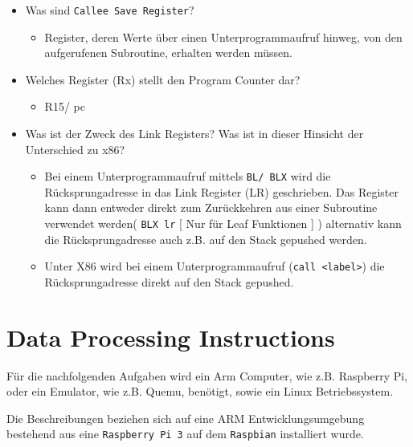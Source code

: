 \documentclass[12pt]{article}
\begin{document}
\begin{itemize}
    \item Was sind \texttt{Callee Save Register}?
        \begin{itemize}
            \item Register, deren Werte über einen Unterprogrammaufruf hinweg,
                von den aufgerufenen Subroutine, erhalten werden müssen.
        \end{itemize}
    \item Welches Register (Rx) stellt den Program Counter dar?
        \begin{itemize}
            \item R15/ pc
        \end{itemize}
    \item Was ist der Zweck des Link Registers? Was ist in dieser Hinsicht der
        Unterschied zu x86?
        \begin{itemize}
            \item Bei einem Unterprogrammaufruf mittels \texttt{BL/ BLX} wird
                die Rücksprungadresse in das Link Register (LR) geschrieben.
                Das Register kann dann entweder direkt zum Zurückkehren aus
                einer Subroutine verwendet werden( \texttt{BLX lr} [ Nur für
                Leaf Funktionen ] ) alternativ kann die Rücksprungadresse auch
                z.B. auf den Stack gepushed werden.
            \item Unter X86 wird bei einem Unterprogrammaufruf (\texttt{call
                <label>}) die Rücksprungadresse direkt auf den Stack gepushed.
        \end{itemize}
\end{itemize}

\section{Data Processing Instructions}
Für die nachfolgenden Aufgaben wird ein Arm Computer, wie z.B. Raspberry Pi,
oder ein Emulator, wie z.B. Quemu, benötigt, sowie ein Linux Betriebssystem.

Die Beschreibungen beziehen sich auf eine ARM Entwicklungsumgebung
bestehend aus eine \texttt{Raspberry Pi 3} auf dem \texttt{Raspbian} installiert
wurde.

\end{document}
